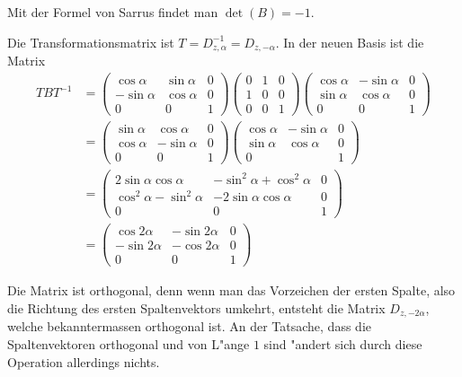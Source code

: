 \begin{loesung}
\begin{teilaufgaben}
\item Mit der Formel von Sarrus findet man $\det(B)=-1$.
\item
Die Transformationsmatrix ist $T=D_{z,\alpha}^{-1}=D_{z,-\alpha}$.
In der neuen Basis ist die Matrix
\begin{align*}
TBT^{-1}
&=
\begin{pmatrix}
 \cos\alpha& \sin\alpha&0\\
-\sin\alpha& \cos\alpha&0\\
 0         &0          &1
\end{pmatrix}
\begin{pmatrix}
0&1&0\\
1&0&0\\
0&0&1
\end{pmatrix}
\begin{pmatrix}
 \cos\alpha&-\sin\alpha&0\\
 \sin\alpha& \cos\alpha&0\\
 0         &0          &1
\end{pmatrix}
\\
&=
\begin{pmatrix}
 \sin\alpha& \cos\alpha&0\\
 \cos\alpha&-\sin\alpha&0\\
 0         &0          &1
\end{pmatrix}
\begin{pmatrix}
 \cos\alpha&-\sin\alpha&0\\
 \sin\alpha& \cos\alpha&0\\
 0         &           &1
\end{pmatrix}
\\
&=
\begin{pmatrix}
 2\sin\alpha\cos\alpha   &-\sin^2\alpha+\cos^2\alpha&0\\
\cos^2\alpha-\sin^2\alpha&-2\sin\alpha\cos\alpha    &0\\
 0                       &0                         &1
\end{pmatrix}
\\
&=
\begin{pmatrix}
 \cos2\alpha &-\sin2\alpha & 0\\
-\sin2\alpha &-\cos2\alpha & 0\\
      0      &      0      & 1
\end{pmatrix}
\end{align*}
\item
Die Matrix ist orthogonal, denn wenn man das Vorzeichen der
ersten Spalte, also die Richtung des ersten Spaltenvektors umkehrt,
entsteht die Matrix $D_{z,-2\alpha}$, welche bekanntermassen
orthogonal ist. An der Tatsache, dass die Spaltenvektoren orthogonal
und von L"ange $1$ sind "andert sich durch diese Operation allerdings
nichts.


\end{teilaufgaben}
\end{loesung}
